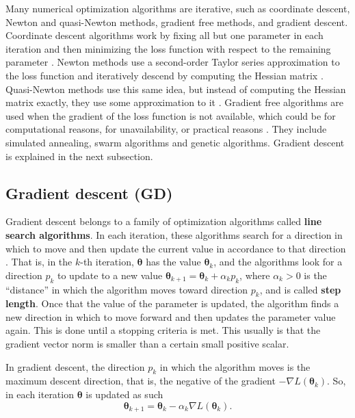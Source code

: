 Many numerical optimization algorithms are iterative, such as coordinate descent, Newton and quasi-Newton methods, gradient free methods, and gradient descent. Coordinate descent algorithms work by fixing all but one parameter in each iteration and then minimizing the loss function with respect to the remaining parameter \cite{friedman2007pathwise} \cite{wright2015coordinate}.
Newton methods use a second-order Taylor series approximation to the loss function and iteratively descend by computing the Hessian matrix \cite[p.~22]{nocedal2006numerical}. Quasi-Newton methods use this same idea, but instead of computing the Hessian matrix exactly, they use some approximation to it \cite{byrd1995limited} \cite[p.~23]{nocedal2006numerical}.
Gradient free algorithms are used when the gradient of the loss function is not available, which could be for computational reasons, for unavailability, or practical reasons \cite{rios2013derivative}. They include simulated annealing, swarm algorithms and genetic algorithms.
Gradient descent is explained in the next subsection.

\subsection{Gradient descent (GD)}

Gradient descent belongs to a family of optimization algorithms called \textbf{line search algorithms}. In each iteration, these algorithms search for a direction in which to move and then update the current value in accordance to that direction \cite[p.~19]{nocedal2006numerical}. That is, in the $k$-th iteration, $\boldsymbol{\theta}$ has the value $\boldsymbol{\theta}_k$, and the algorithms look for a direction $p_k$ to update to a new value $\boldsymbol{\theta}_{k+1} = \boldsymbol{\theta}_k + \alpha_k p_k$, where $\alpha_k > 0$ is the ``distance'' in which the algorithm moves toward direction $p_k$, and is called \textbf{step length}. Once that the value of the parameter is updated, the algorithm finds a new direction in which to move forward and then updates the parameter value again. This is done until a stopping criteria is met. This usually is that the gradient vector norm is smaller than a certain small positive scalar.

In gradient descent, the direction $p_k$ in which the algorithm moves is the maximum descent direction, that is, the negative of the gradient $-\nabla L(\boldsymbol{\theta}_k)$. So, in each iteration $\boldsymbol{\theta}$ is updated as such
\begin{equation}
  \label{eq:parameter_update_gd}
  \boldsymbol{\theta}_{k+1} = \boldsymbol{\theta}_k - \alpha_k \nabla L(\boldsymbol{\theta}_k).
\end{equation}

